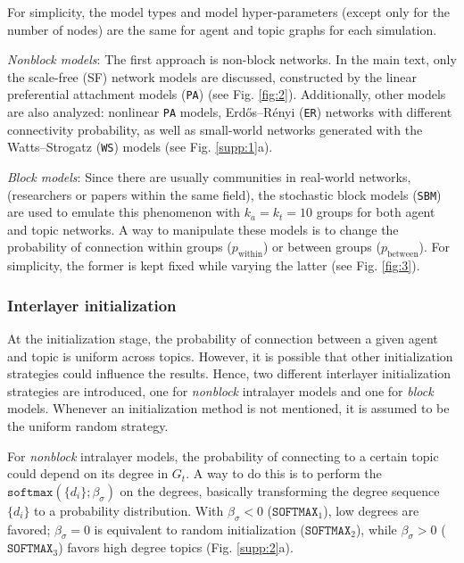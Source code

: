 \documentclass{svproc}
\begin{document}
For simplicity, the model types and model hyper-parameters (except only for the number of nodes) are the same for agent and topic graphs for each simulation.

\textit{Nonblock models}: The first approach is non-block networks.
In the main text, only the scale-free (SF) network models are discussed, constructed by the linear preferential attachment models (\texttt{PA}) \cite{Barabasi1999-dw} (see Fig. \ref{fig:2}).
Additionally, other models are also analyzed: nonlinear \texttt{PA} models, Erdős–Rényi (\texttt{ER}) networks \cite{Erdos1959-dj} with different connectivity probability, as well as small-world networks generated with the Watts–Strogatz (\texttt{WS}) models \cite{Watts1998-vh} (see Fig. \ref{supp:1}a).

\textit{Block models}: Since there are usually communities in real-world networks, (researchers or papers within the same field), the stochastic block models (\texttt{SBM}) \cite{Faust1992-xo} are used to emulate this phenomenon with $k_a = k_t = 10$ groups for both agent and topic networks.
A way to manipulate these models is to change the probability of connection within groups ($p_{\mathrm{within}}$) or between groups ($p_{\mathrm{between}}$).
For simplicity, the former is kept fixed while varying the latter (see Fig. \ref{fig:3}).

\vspace{-1em}
\subsubsection*{Interlayer initialization}

At the initialization stage, the probability of connection between a given agent and topic is uniform across topics.
However, it is possible that other initialization strategies could influence the results.
Hence, two different interlayer initialization strategies are introduced,
    one for \textit{nonblock} intralayer models
    and one for \textit{block} models.
Whenever an initialization method is not mentioned, it is assumed to be the uniform random strategy.

For \textit{nonblock} intralayer models, the probability of connecting to a certain topic could depend on its degree in $G_t$.
A way to do this is to perform the $\texttt{softmax}\left(\{d_i\}; \beta_{\sigma}\right)$ on the degrees, basically transforming the degree sequence $\{d_i\}$ to a probability distribution.
With
    $\beta_{\sigma} < 0$ ($\texttt{SOFTMAX}_1$), low degrees are favored;
    $\beta_{\sigma} = 0$ is equivalent to random initialization ($\texttt{SOFTMAX}_2$),
    while $\beta_{\sigma} > 0$  ($\texttt{SOFTMAX}_3$) favors high degree topics (Fig. \ref{supp:2}a).
\end{document}
